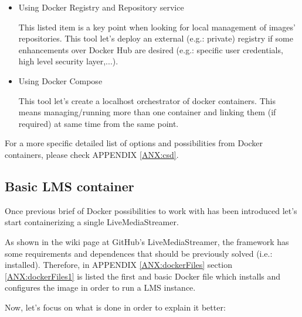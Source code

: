 \begin{itemize}
\begin{itemize}
	\item Using Docker Registry and Repository service

	This	 listed item is a key point when looking for local management of images' repositories. This tool let's deploy an external (e.g.: private) registry if some enhancements over Docker Hub are desired (e.g.: specific user credentials, high level security layer,...).
	
	\item Using Docker Compose
	
	This tool let's create a localhost orchestrator of docker containers. This means managing/running more than one container and linking them (if required) at same time from the same point.
	
	\end{itemize}
\end{itemize}

For a more specific detailed list of options and possibilities from Docker containers, please check APPENDIX \ref{ANX:csd}.

\subsection{Basic LMS container}

Once previous brief of Docker possibilities to work with has been introduced let's start containerizing a single LiveMediaStreamer.

As shown in the wiki page at GitHub's LiveMediaStreamer, the framework has some requirements and dependences that should be previously solved (i.e.: installed). Therefore, in APPENDIX \ref{ANX:dockerFiles} section \ref{ANX:dockerFiles1} is listed the first and basic Docker file which installs and configures the image in order to run a LMS instance. 

Now, let's focus on what is done in order to explain it better: 

